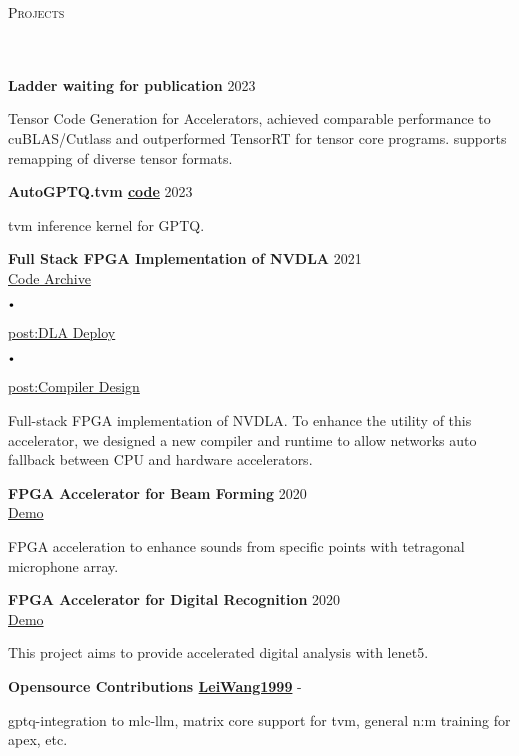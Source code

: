\documentclass{article}
\newcommand{\header}[1]{{
\hspace*{-15pt}\vspace*{6pt} \textsc{#1}} \vspace*{-6pt} 
\lineunder
}
\newcommand{\lineunder}{
\vspace*{-8pt} \\ \hspace*{-18pt} 
\hrulefill \\
}
\newcommand{\project}[3]{{
\vspace*{2pt}%
\textbf{#1} \hfill #2\\ #3 \vspace*{2pt}}
}
\renewcommand{\labelitemi}{
$\vcenter{\hbox{\tiny$\bullet$}}$\hspace*{3pt}
}
\renewcommand{\labelitemii}{
$\vcenter{\hbox{\tiny$\bullet$}}$\hspace*{-3pt}
}
\newcommand{\myhref}[2]{%
\href{#1}{\textcolor{ColorTwo}{#2}}
}
\newenvironment{bullet-list-minor}{
\begin{list}{\labelitemii}{\setlength\leftmargin{15pt} 
\topsep 0pt \itemsep -2pt}}{\vspace*{4pt}\end{list}
}
\begin{document}
\vspace*{4pt}%
\header{Projects}
    \project{Ladder \textcolor{ColorOne}
{waiting for publication}}{2023}{}
    \begin{bullet-list-minor}
	\item Tensor Code Generation for Accelerators, achieved comparable performance to cuBLAS/Cutlass and outperformed TensorRT for tensor core programs. supports remapping of diverse tensor formats.
    \end{bullet-list-minor}
    \project{AutoGPTQ.tvm     \textcolor{ColorTwo}{\faGithub} 
\myhref{https://github.com/LeiWang1999/AutoGPTQ.tvm}{code}}{2023}{}
    \begin{bullet-list-minor}
	\item tvm inference kernel for GPTQ.
    \end{bullet-list-minor}
    \project{Full Stack FPGA Implementation of NVDLA}{2021}{
    \textcolor{ColorTwo}{\faGithub} 
\myhref{https://github.com/LeiWang1999/ZYNQ-NVDLA}{Code Archive}
    \labelitemi
    \textcolor{ColorTwo}{\faBook} 
\myhref{https://zhuanlan.zhihu.com/p/378202360}{post:DLA Deploy}
    \labelitemi
        \textcolor{ColorTwo}{\faBook} 
    \myhref{https://zhuanlan.zhihu.com/p/401943271}{post:Compiler Design}
}
	\begin{bullet-list-minor}
	\item Full-stack FPGA implementation of NVDLA. To enhance the utility of this accelerator, we designed a new compiler and runtime to allow networks auto fallback between CPU and hardware
                accelerators.
    \end{bullet-list-minor}
    \project{FPGA Accelerator for Beam Forming}{2020}{
    \textcolor{ColorTwo}{\faVideoCamera} 
    \myhref{https://github.com/LeiWang1999}{Demo}
}
	\begin{bullet-list-minor}
	\item FPGA acceleration to enhance sounds from specific points with tetragonal microphone array.
    \end{bullet-list-minor}
    \project{FPGA Accelerator for Digital Recognition}{2020}{
    \textcolor{ColorTwo}{\faVideoCamera} 
    \myhref{https://github.com/LeiWang1999}{Demo}
}
	\begin{bullet-list-minor}
	\item This project aims to provide accelerated digital analysis with lenet5.
    \end{bullet-list-minor}
    \project{Opensource Contributions     \textcolor{ColorTwo}{\faGithub} 
    \myhref{https://github.com/LeiWang1999}{LeiWang1999}}{-}{
}
	\begin{bullet-list-minor}
	\item gptq-integration to mlc-llm, matrix core support for tvm, general n:m training for apex, etc.
    \end{bullet-list-minor}
 
\end{document}
